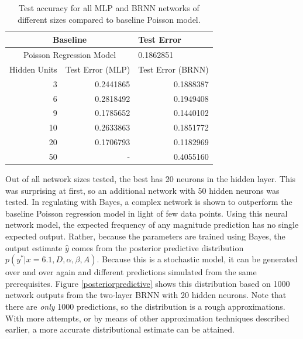 \begin{table}[ht]
\centering
\begin{tabular}{rrr}
  \hline
\multicolumn{2}{c}{Baseline} & \multicolumn{1}{l}{Test Error} \\ 
  \hline
  \multicolumn{2}{c}{Poisson Regression Model} & \multicolumn{1}{l}{0.1862851} \\ 
  \hline
Hidden Units & Test Error (MLP) & Test Error (BRNN) \\ 
  \hline
3 & 0.2441865  & 0.1888387 \\ 
6 & 0.2818492  & 0.1949408 \\ 
9 & 0.1785652  & 0.1440102 \\ 
10 & 0.2633863  & 0.1851772 \\ 
20 & 0.1706793  & 0.1182969 \\ 
 50 & - & 0.4055160 \\ 
   \hline
\end{tabular}
   \caption{Test accuracy for all MLP and BRNN networks of different sizes compared to baseline Poisson model.}
\end{table}



Out of all network sizes tested, the best has 20 neurons in the hidden layer.  This was surprising at first, so an additional network with 50 hidden neurons was tested.  In regulating with Bayes, a complex network is shown to outperform the baseline Poisson regression model in light of few data points.  Using this neural network model, the expected frequency of any magnitude prediction has no single expected output.  Rather, because the parameters are trained using Bayes, the output estimate $\hat{y}$ comes from the posterior predictive distribution $p(y^*|x=6.1,D,\alpha,\beta,A)$.  Because this is a stochastic model, it can be generated over and over again and different predictions simulated from the same prerequisites.  Figure \ref{posteriorpredictive} shows this distribution based on 1000 network outputs from the two-layer BRNN with 20 hidden neurons.  Note that there are \textit{only} 1000 predictions, so the distribution is a rough approximations.  With more attempts, or by means of other approximation techniques described earlier, a more accurate distributional estimate can be attained.

